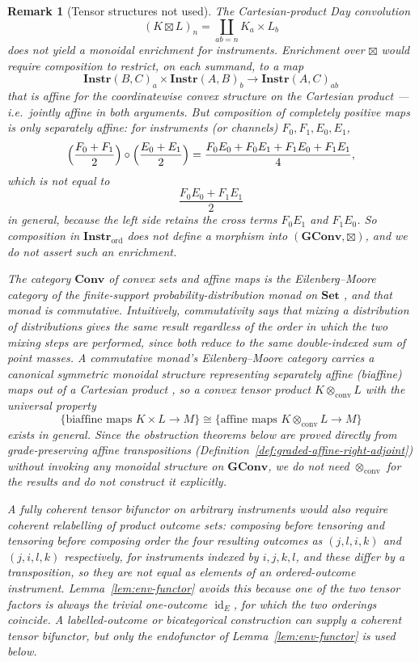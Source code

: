 \documentclass[11pt]{article}
\newtheorem{remark}[theorem]{Remark}
\DeclareMathOperator{\id}{id}
\begin{document}
\begin{remark}[Tensor structures not used]
\label{rem:grading-tensor}
The Cartesian-product Day convolution
\[
(K\boxtimes L)_n
=
\coprod_{ab=n}K_a\times L_b
\]
does not yield a monoidal enrichment for instruments. Enrichment over
$\boxtimes$ would require composition to restrict, on each summand, to a map
\[
\mathbf{Instr}(B,C)_a\times \mathbf{Instr}(A,B)_b
\longrightarrow
\mathbf{Instr}(A,C)_{ab}
\]
that is affine for the coordinatewise convex structure on the Cartesian
product --- i.e.\ jointly affine in both arguments. But composition of
completely positive maps is only separately affine: for instruments (or
channels) $F_0,F_1,E_0,E_1$,
\[
\Bigl(\frac{F_0+F_1}{2}\Bigr)\circ
\Bigl(\frac{E_0+E_1}{2}\Bigr)
=
\frac{F_0E_0+F_0E_1+F_1E_0+F_1E_1}{4},
\]
which is not equal to
\[
\frac{F_0E_0+F_1E_1}{2}
\]
in general, because the left side retains the cross terms $F_0E_1$ and
$F_1E_0$. So composition in $\mathbf{Instr}_{\mathrm{ord}}$ does not define
a morphism into $(\mathbf{GConv},\boxtimes)$, and we do not assert such an
enrichment.

The category $\mathbf{Conv}$ of convex sets and affine maps is the
Eilenberg--Moore category of the finite-support probability-distribution
monad on $\mathbf{Set}$ \cite{Swirszcz1974}, and that monad is commutative.
Intuitively, commutativity says that mixing a distribution of distributions
gives the same result regardless of the order in which the two mixing steps
are performed, since both reduce to the same double-indexed sum of point
masses. A commutative monad's Eilenberg--Moore category carries a canonical
symmetric monoidal structure representing separately affine (biaffine) maps
out of a Cartesian product \cite{Kock1971}, so a convex tensor product
$K\otimes_{\mathrm{conv}}L$ with the universal property
\[
\{\text{biaffine maps }K\times L\to M\}
\cong
\{\text{affine maps }K\otimes_{\mathrm{conv}}L\to M\}
\]
exists in general. Since the obstruction theorems below are proved directly
from grade-preserving affine transpositions
(Definition~\ref{def:graded-affine-right-adjoint}) without invoking any
monoidal structure on $\mathbf{GConv}$, we do not need
$\otimes_{\mathrm{conv}}$ for the results and do not construct it
explicitly.

A fully coherent tensor bifunctor on arbitrary instruments would also require
coherent relabelling of product outcome sets: composing before tensoring and
tensoring before composing order the four resulting outcomes as
$(j,l,i,k)$ and $(j,i,l,k)$ respectively, for instruments indexed by
$i,j,k,l$, and these differ by a transposition, so they are not equal as
elements of an ordered-outcome instrument. Lemma~\ref{lem:env-functor} avoids
this because one of the two tensor factors is always the trivial one-outcome
$\id_E$, for which the two orderings coincide. A labelled-outcome or
bicategorical construction can supply a coherent tensor bifunctor, but only
the endofunctor of Lemma~\ref{lem:env-functor} is used below.
\end{remark}
\end{document}
